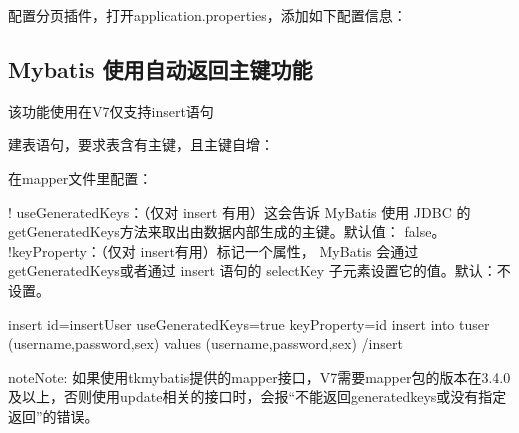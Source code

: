 \documentclass[a4,10pt,oneside,english]{sphinxmanual}
\begin{document}
配置分页插件，打开application.properties，添加如下配置信息：

\begin{sphinxVerbatim}[commandchars=\\\{\}]
\end{sphinxVerbatim}


\subsection{Mybatis 使用自动返回主键功能}
\label{\detokenize{interface/mybatis:id1}}
该功能使用在V7仅支持insert语句

建表语句，要求表含有主键，且主键自增：

\begin{sphinxVerbatim}[commandchars=\\\{\}]
          
\end{sphinxVerbatim}

在mapper文件里配置：

\begin{sphinxVerbatim}[commandchars=\\\{\}]
\PYGZlt{}!\PYGZhy{}\PYGZhy{} useGeneratedKeys：（仅对 insert 有用）这会告诉 MyBatis 使用 JDBC 的getGeneratedKeys方法来取出由数据内部生成的主键。默认值： false。 \PYGZhy{}\PYGZhy{}\PYGZgt{}
\PYGZlt{}!\PYGZhy{}\PYGZhy{}keyProperty：（仅对 insert有用）标记一个属性， MyBatis 会通过 getGeneratedKeys或者通过 insert 语句的 selectKey 子元素设置它的值。默认：不设置。 \PYGZhy{}\PYGZhy{}\PYGZgt{}

         \PYGZlt{}insert id=\PYGZdq{}insertUser\PYGZdq{} useGeneratedKeys=\PYGZdq{}true\PYGZdq{} keyProperty=\PYGZdq{}id\PYGZdq{}\PYGZgt{}
                   insert into t\PYGZus{}user (username,password,sex) values
                   (\PYGZsh{}\PYGZob{}username\PYGZcb{},\PYGZsh{}\PYGZob{}password\PYGZcb{},\PYGZsh{}\PYGZob{}sex\PYGZcb{})
         \PYGZlt{}/insert\PYGZgt{}
\end{sphinxVerbatim}

\begin{sphinxadmonition}{note}{Note:}
如果使用tk\sphinxhyphen{}mybatis提供的mapper接口，V7需要mapper包的版本在3.4.0及以上，否则使用update相关的接口时，会报“不能返回generatedkeys或没有指定返回”的错误。
\end{sphinxadmonition}
\end{document}
